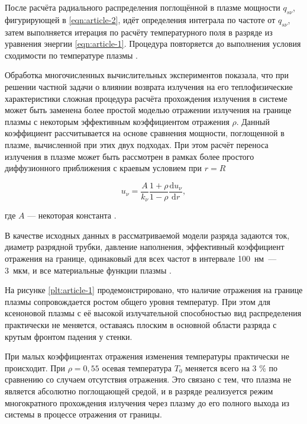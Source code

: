 После расчёта радиального распределения поглощённой в плазме мощности $q_{s\nu}$, фигурирующей в \eqref{eqn:article-2}, идёт определения интеграла по частоте от $q_{s\nu}$, затем выполняется итерация по расчёту температурного поля в разряде из уравнения энергии \eqref{eqn:article-1}.
Процедура повторяется до выполнения условия сходимости по температуре плазмы \cite{article-5-kalitkin}.

Обработка многочисленных вычислительных экспериментов \cite{gradov-dissertation, article-6-gradov} показала, что при решении частной задачи о влиянии возврата излучения на его теплофизические характеристики сложная процедура расчёта прохождения излучения в системе может быть заменена более простой моделью отражении излучения на границе плазмы с некоторым эффективным коэффициентом отражения $\rho$.
Данный коэффициент рассчитывается на основе сравнения мощности, поглощенной в плазме, вычисленной при этих двух подходах.
При этом расчёт переноса излучения в плазме может быть рассмотрен в рамках более простого диффузионного приближения \cite{gradov-dissertation, article-6-gradov, article-7-zeldovich} с краевым условием при $r = R$

\begin{equation}
	u_\nu = \frac{A}{k_\nu} \frac{1 + \rho}{1 - \rho} \frac{\mathrm du_\nu}{\mathrm dr},
\end{equation}

\noindent где $A$ — некоторая константа \cite{gradov-dissertation, article-6-gradov}.

В качестве исходных данных в рассматриваемой модели разряда задаются ток, диаметр разрядной трубки, давление наполнения, эффективный коэффициент отражения на границе, одинаковый для всех частот в интервале 100~нм~— 3~мкм, и все материальные функции плазмы \cite{article-8-gradov, article-9-gradov}.

На рисунке \ref{plt:article-1} продемонстрировано, что наличие отражения на границе плазмы сопровождается ростом общего уровня температур.
При этом для ксеноновой плазмы с её высокой излучательной способностью вид распределения практически не меняется, оставаясь плоским в основной области разряда с крутым фронтом падения у стенки.

При малых коэффициентах отражения изменения температуры практически не происходит.
При $\rho = 0,55$ осевая температура $T_0$ меняется всего на 3 \% по сравнению со случаем отсутствия отражения.
Это связано с тем, что плазма не является абсолютно поглощающей средой, и в разряде реализуется режим многократного прохождения излучения через плазму до его полного выхода из системы в процессе отражения от границы.

